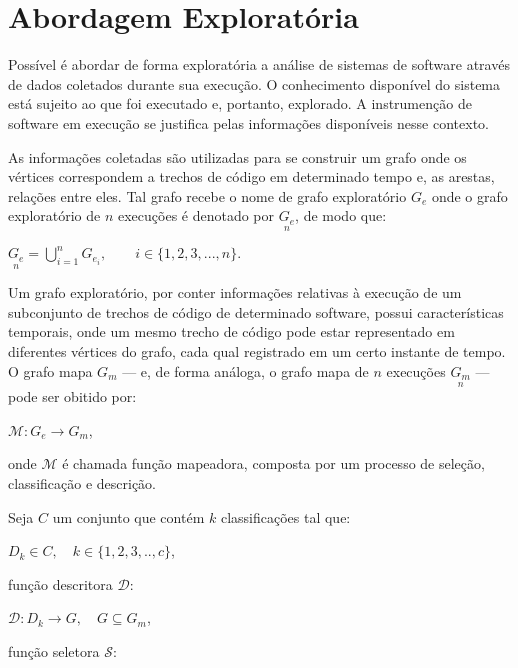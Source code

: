 
\section{Abordagem Exploratória}

Possível é abordar de forma exploratória a análise de sistemas de software
através de dados coletados durante sua execução. O conhecimento disponível do
sistema está sujeito ao que foi executado e, portanto, explorado. A instrumenção
de software em execução se justifica pelas informações disponíveis nesse
contexto.

As informações coletadas são utilizadas para se construir um grafo onde os
vértices correspondem a trechos de código em determinado tempo e, as arestas,
relações entre eles. Tal grafo recebe o nome de grafo exploratório $G_e$ onde o
grafo exploratório de $n$ execuções é denotado por $\underset{n}{G_e}$, de modo
que:

\begin{center}
  $\underset{n}{G_e} = \bigcup\limits_{i=1}^n G_{e_i},
   \qquad i \in \{ 1,2,3,...,n \}.$
\end{center}

Um grafo exploratório, por conter informações relativas à execução de um
subconjunto de trechos de código de determinado software, possui características
temporais, onde um mesmo trecho de código pode estar representado em diferentes
vértices do grafo, cada qual registrado em um certo instante de tempo. O grafo
mapa $G_m$ --- e, de forma análoga, o grafo mapa de $n$ execuções
$\underset{n}{G_m}$ --- pode ser obitido por:

\begin{center}
  $\mathcal{M}:G_e \rightarrow G_m$,
\end{center}

onde $\mathcal{M}$ é chamada função mapeadora, composta por um processo de
seleção, classificação e descrição.

Seja $C$ um conjunto que contém $k$ classificações tal que:

\begin{center}
  $D_k \in C, \quad k \in \{ 1, 2, 3, .., c \}$,
\end{center}

função descritora $\mathcal{D}$:

\begin{center}
  $\mathcal{D}:D_k \rightarrow G, \quad G \subseteq {G_m}$,
\end{center}

função seletora $\mathcal{S}$:

